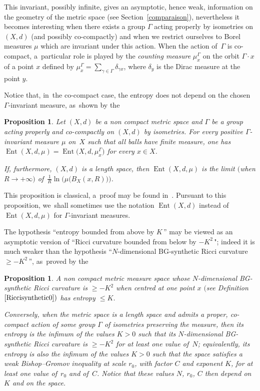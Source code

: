 \documentclass[10pt,a4paper]{amsart}
\numberwithin{equation}{section}
\newtheorem{prop}[theor]{Proposition}
\newcommand{\Ent}{\operatorname{Ent}}
\begin{document}
This invariant, possibly infinite, gives an asymptotic, hence weak, information on the geometry of the metric space (see Section~\ref{comparaison}), nevertheless it becomes interesting
when there exists a group $ \Gamma $ acting properly by isometries on $ (X,d) $ (and possibly co-compactly) and when we restrict ourselves to Borel measures $ \mu $ which are invariant under this action. When the action of~$\Gamma$ is co-compact, a~particular role is played by the \emph{counting measure} $ \mu_{x}^{\Gamma} $ on the orbit $ \Gamma \cdot x $ of a point $ x $ defined by $ \mu^\Gamma_x = \sum_{\gamma \in \Gamma} \delta_{\gamma x}$, where $\delta_y$ is the Dirac measure at the point $y$.

Notice that, in~the co-compact case, the entropy does not depend on the chosen $ \Gamma$-invariant measure, as~shown by the

\begin{prop}\label{Entropies1}
Let $(X,d)$ be a non compact metric space and $ \Gamma $ be a group acting properly and co-compactly on $(X,d)$
by isometries. For every positive $\Gamma$-invariant measure $\mu $ on~$X$ such that all balls have finite measure, one has $\Ent (X,d, \mu) =\Ent \big(X,d, \mu_{x}^{\Gamma}\big)$ for every $x \in X$.

If, furthermore, $(X,d)$ is a length space, then $\Ent (X,d, \mu)$ is the limit $($when $R \to +\infty)$ of~$ \frac{1}{R} \ln \big(\mu \big(B_X (x, R)\big)\big)$.
\end{prop}

This proposition is classical, a~proof may be found in~\cite[Proposition~3.3]{BCGS}.
Pursuant to this proposition, we~shall sometimes use the notation $ \Ent (X,d) $ instead of~$ \Ent (X,d, \mu) $ for $\Gamma$-invariant measures.

The hypothesis ``entropy bounded from above by $K\,$'' may be viewed
as an asymptotic version of ``Ricci curvature bounded from below by
$- K^2\,$"; indeed it is much weaker than the hypothesis ``$N$-dimensional BG-synthetic Ricci curvature $\ge - K^2\,$'', as~proved by the

\begin{prop}\label{BishopvsEntropy}
A non compact metric measure space whose $N$-dimensional BG-synthetic Ricci curvature is $\ge -K^2$ when centred at one point $x$ $($see Definition~$\ref{Riccisynthetic0})$ has entropy $\le K$.

Conversely, when the metric space is a length space and admits a proper,
co-compact action of some group $\Gamma$ of isometries preserving the measure, then its entropy is the infimum of the values $K>0$ such that its $N$-dimensional BG-synthetic Ricci curvature is $\ge -K^2$ for at least one value of~$N$; equivalently, its entropy is also the infimum of the values $K>0$ such that the space satisfies a weak Bishop--Gromov inequality at
scale $r_0$, with factor $C$ and exponent $K$, for at least one value of~$r_0$ and of~$C$. Notice that these values $N$, $r_0$, $C$ then depend on $K$
and on the space.
\end{prop}
\end{document}
